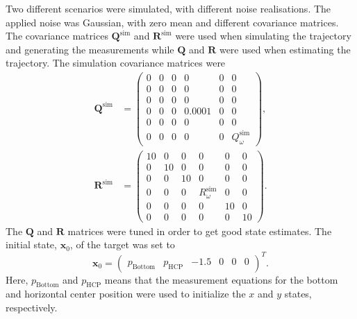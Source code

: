 Two different scenarios were simulated, with different noise realisations.
The applied noise was Gaussian, with zero mean and different covariance matrices.
The covariance matrices $\bm{Q}^\text{sim}$ and $\bm{R}^\text{sim}$ were used when simulating the trajectory and generating the measurements while $\bm{Q}$ and $\bm{R}$ were used when estimating the trajectory.
The simulation covariance matrices were
\begin{align}
	\label{eq:Qsim}
	\bm{Q}^\text{sim} &=
	\begin{pmatrix}
		0 & 0 & 0 & 0 & 0 & 0 \\
		0 & 0 & 0 & 0 & 0 & 0 \\
		0 & 0 & 0 & 0 & 0 & 0 \\
		0 & 0 & 0 & 0.0001 & 0 & 0 \\
		0 & 0 & 0 & 0 & 0 & 0 \\
		0 & 0 & 0 & 0 & 0 & Q^\text{sim}_\omega
	\end{pmatrix}
	,
	\\
	\label{eq:Rsim}
	\bm{R}^\text{sim} &=
	\begin{pmatrix}
		10 & 0 & 0 & 0 & 0 & 0 \\
		0 & 10 & 0 & 0 & 0 & 0 \\
		0 & 0 & 10 & 0 & 0 & 0 \\
		0 & 0 & 0 & R^\text{sim}_\omega & 0 & 0 \\
		0 & 0 & 0 & 0 & 10 & 0 \\
		0 & 0 & 0 & 0 & 0 & 10
	\end{pmatrix}
	.
\end{align}
The $\bm{Q}$ and $\bm{R}$ matrices were tuned in order to get good state estimates.
The initial state, $\bm{x}_0$, of the target was set to
%
\begin{equation*}
	\bm{x}_0 =
	\begin{pmatrix}
		p_\text{Bottom} & p_\text{HCP} & -1.5 & 0 & 0 & 0
	\end{pmatrix}^T.
\end{equation*}
%
Here, $p_\text{Bottom}$ and $p_\text{HCP}$ means that the measurement equations for the \abbrROI bottom and \abbrROI horizontal center position were used to initialize the $x$ and $y$ states, respectively.

\newpage


